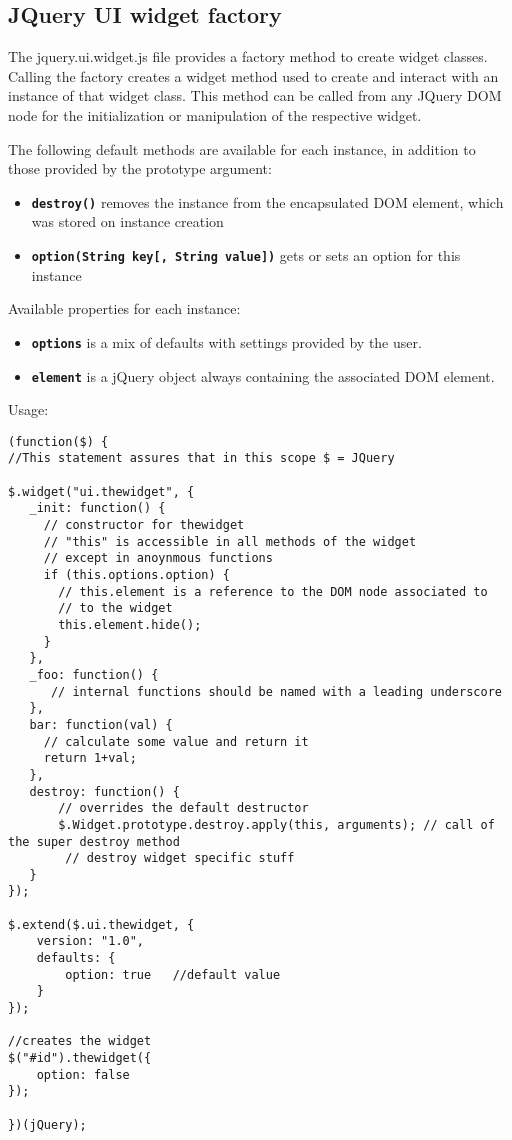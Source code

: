 \subsection{JQuery UI widget factory}
The jquery.ui.widget.js file provides a factory method to create widget classes. Calling the factory creates a widget method used to create and interact with an instance of that widget class. This method can be called from any JQuery DOM node for the initialization or manipulation of the respective widget.

The following default methods are available for each instance, in addition to those provided by the prototype argument:
    \begin{itemize}
        \item \textbf{\lstinline!destroy()!}
            removes the instance from the encapsulated DOM element, which was stored on instance creation
        \item \textbf{\lstinline!option(String key[, String value])!}
            gets or sets an option for this instance
    \end{itemize}

Available properties for each instance:
    \begin{itemize}
        \item \textbf{\lstinline!options!}
            is a mix of defaults with settings provided by the user.
        \item \textbf{\lstinline!element!}
            is a jQuery object always containing the associated DOM element.
    \end{itemize}

Usage:
\begin{lstlisting}[caption=sourcecode of a JQuery UI widget,label=lst:jquery:writewidget]
(function($) {
//This statement assures that in this scope $ = JQuery

$.widget("ui.thewidget", {
   _init: function() {
     // constructor for thewidget
     // "this" is accessible in all methods of the widget
     // except in anoynmous functions
     if (this.options.option) {
       // this.element is a reference to the DOM node associated to
       // to the widget
       this.element.hide();
     }
   },
   _foo: function() {
      // internal functions should be named with a leading underscore
   },
   bar: function(val) {
     // calculate some value and return it
     return 1+val;
   },
   destroy: function() {
       // overrides the default destructor
       $.Widget.prototype.destroy.apply(this, arguments); // call of the super destroy method
        // destroy widget specific stuff
   }
});

$.extend($.ui.thewidget, {
	version: "1.0",
	defaults: {
        option: true   //default value
    }
});

//creates the widget
$("#id").thewidget({
    option: false
});

})(jQuery);
\end{lstlisting}
